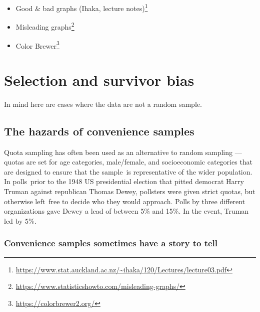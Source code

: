 \documentclass[
  10ptls,
  b5paper]{book}
\providecommand{\tightlist}{%
  \setlength{\itemsep}{0pt}\setlength{\parskip}{0pt}}
\begin{document}
\begin{itemize}
\tightlist
\item
  Good \& bad graphs (Ihaka, lecture notes)\footnote{\url{https://www.stat.auckland.ac.nz/~ihaka/120/Lectures/lecture03.pdf}}
\item
  Misleading graphs\footnote{\url{https://www.statisticshowto.com/misleading-graphs/}}
\item
  Color Brewer\footnote{\url{https://colorbrewer2.org/}}
\end{itemize}

\hypertarget{selection-and-survivor-bias}{%
\chapter{Selection and survivor bias}\label{selection-and-survivor-bias}}

In mind here are cases where the data are not a random sample.

\hypertarget{the-hazards-of-convenience-samples}{%
\section{The hazards of convenience samples}\label{the-hazards-of-convenience-samples}}

Quota sampling has often been used as an alternative to random
sampling --- quotas are set for age categories, male/female,
and socioeconomic categories that are designed to ensure that
the sample~is representative of the wider population.
In polls~prior to the 1948 US presidential election that
pitted democrat Harry Truman against republican Thomas Dewey,
pollsters were given strict quotas, but otherwise left~free to
decide who they would approach. Polls by three different
organizations gave Dewey a lead of between 5\% and 15\%. In the
event, Truman led by 5\%.

\hypertarget{convenience-samples-sometimes-have-a-story-to-tell}{%
\subsection*{Convenience samples sometimes have a story to tell}\label{convenience-samples-sometimes-have-a-story-to-tell}}
\end{document}
